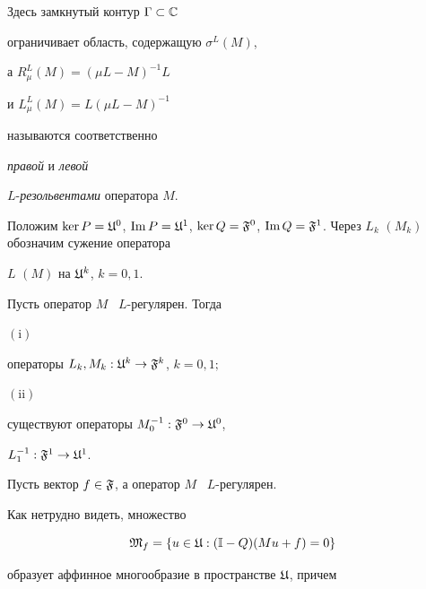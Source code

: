 Здесь замкнутый контур $\Gamma\subset{\Bbb C}$


ограничивает область, содержащую $\sigma^L (M)$,


а $R^L_\mu (M) = (\mu L - M)^{-1} L$


и $L^L_\mu (M) = L (\mu L - M)^{-1}$


называются соответственно


{\it правой} и {\it левой}


$L$-{\it резольвентами} оператора $M$.





Положим $\ker P = {\frak U}^0$, $\im P =


{\frak U}^1$, $\ker Q = {\frak F}^0$, $\im 


Q = {\frak F}^1$. Через $L_k$ $(M_k)$ обозначим сужение оператора


$L$ $(M)$ на ${\frak U}^k$, $k = 0, 1$.





\begin{thms} 


Пусть оператор $M$ \ $L$-регулярен. Тогда





$\mathrm{(i)}$


операторы $L_k, M_k : {\frak U}^k\to {\frak F}^k$, $k = 0, 1;$





$\mathrm{(ii)}$


существуют операторы $M_0^{-1} : {\frak F}^0\to {\frak U}^0$,


$L_1^{-1} : {\frak F}^1\to {\frak U}^1$.


\end{thms}





Пусть вектор $f\in{\frak F}$, а оператор $M$ \ $L$-регулярен.


Как нетрудно видеть,  множество


$$


{\frak M}_f = \{u\in{\frak U} : ({\Bbb


I} - Q) (Mu + f) = 0\}


$$


образует аффинное многообразие в пространстве ${\frak U}$, причем


$$


